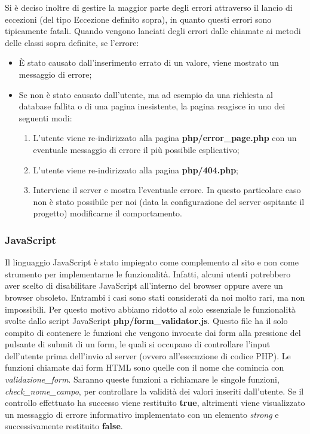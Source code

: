 \documentclass[1_relazione.tex]{subfiles}
\begin{document}
Si è deciso inoltre di gestire la maggior parte degli errori attraverso il lancio di eccezioni (del tipo Eccezione definito sopra), in quanto questi errori sono tipicamente fatali.
Quando vengono lanciati degli errori dalle chiamate ai metodi delle classi sopra definite, se l'errore:
\begin{itemize}
    \item \`{E} stato causato dall'inserimento errato di un valore, viene mostrato un messaggio di errore;
    \item Se non \`{e} stato causato dall'utente, ma ad esempio da una richiesta al database fallita o di una pagina inesistente, la pagina reagisce in uno dei seguenti modi:
    \begin{enumerate}
        \item L'utente viene re-indirizzato alla pagina \textbf{php/error\_page.php} con un eventuale messaggio di errore il più possibile esplicativo;
        \item L'utente viene re-indirizzato alla pagina \textbf{php/404.php};
        \item Interviene il server e mostra l'eventuale errore. In questo particolare caso non è stato possibile per noi (data la configurazione del server ospitante il progetto) modificarne il comportamento.
    \end{enumerate}
\end{itemize}

\subsubsection{JavaScript}
Il linguaggio JavaScript \`{e} stato impiegato come complemento al sito e non come strumento per implementarne le funzionalità.
Infatti, alcuni utenti potrebbero aver scelto di disabilitare JavaScript all'interno del browser oppure avere un browser obsoleto. Entrambi i casi sono stati considerati da noi molto rari, ma non impossibili.
Per questo motivo abbiamo ridotto al solo essenziale le funzionalità svolte dallo script JavaScript \textbf{php/form\_validator.js}.
Questo file ha il solo compito di contenere le funzioni che vengono invocate dai form alla pressione del pulsante di submit di un form, le quali si occupano di controllare l'input dell'utente prima dell'invio al server (ovvero all'esecuzione di codice PHP).
Le funzioni chiamate dai form HTML sono quelle con il nome che comincia con \textit{validazione\_form}. Saranno queste funzioni a richiamare le singole funzioni, \textit{check_nome_campo}, per controllare la validit\`{a} dei valori inseriti dall'utente.
Se il controllo effettuato ha successo viene restituito \textbf{true}, altrimenti viene visualizzato un messaggio di errore informativo implementato con un elemento \textit{strong} e successivamente restituito \textbf{false}.
\end{document}
